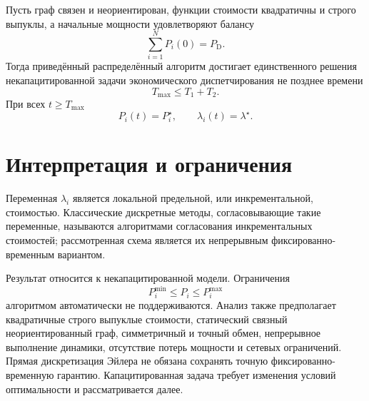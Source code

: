 \begin{theorem}
Пусть граф связен и неориентирован, функции стоимости квадратичны и
строго выпуклы, а начальные мощности удовлетворяют балансу
\[
    \sum_{i=1}^{N}P_i(0)=P_{\mathrm D}.
\]
Тогда приведённый распределённый алгоритм достигает единственного
решения некапацитированной задачи экономического диспетчирования не
позднее времени
\[
    T_{\max}\le T_1+T_2.
\]
При всех \(t\ge T_{\max}\)
\[
    P_i(t)=P_i^\star,
    \qquad
    \lambda_i(t)=\lambda^\star.
\]
\end{theorem}

\section{Интерпретация и ограничения}

Переменная \(\lambda_i\) является локальной предельной, или
инкрементальной, стоимостью. Классические дискретные методы,
согласовывающие такие переменные, называются алгоритмами согласования
инкрементальных стоимостей; рассмотренная схема является их
непрерывным фиксированно-временным вариантом.

Результат относится к некапацитированной модели. Ограничения
\[
    P_i^{\min}\le P_i\le P_i^{\max}
\]
алгоритмом автоматически не поддерживаются. Анализ также предполагает
квадратичные строго выпуклые стоимости, статический связный
неориентированный граф, симметричный и точный обмен, непрерывное
выполнение динамики, отсутствие потерь мощности и сетевых
ограничений. Прямая дискретизация Эйлера не обязана сохранять точную
фиксированно-временную гарантию. Капацитированная задача требует
изменения условий оптимальности и рассматривается далее.
